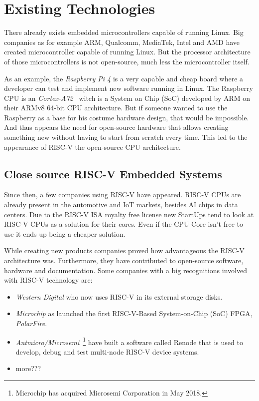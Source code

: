 \chapter{Existing Technologies}
There already exists embedded microcontrollers capable of running Linux. Big companies as for example ARM, Qualcomm, MediaTek, Intel and AMD have created microcontroller capable of running Linux. But the processor architecture of those microcontrollers is not open-source, much less the microcontroller itself. 

As an example, the \textit{Raspberry Pi 4} is a very capable and cheap board where a developer can test and implement new software running in Linux. The Raspberry CPU is an \textit{Cortex-A72}~\cite{cortex_a72} witch is a System on Chip (SoC) developed by ARM on their ARMv8 64-bit CPU architecture. But if someone wanted to use the Raspberry as a base for his costume hardware design, that would be impossible. And thus appears the need for open-source hardware that allows creating something new without having to start from scratch every time. This led to the appearance of RISC-V the open-source CPU architecture.


\section{Close source RISC-V Embedded Systems}
Since then, a few companies using RISC-V have appeared. RISC-V CPUs are already present in the automotive and IoT markets, besides AI chips in data centers. Due to the RISC-V ISA royalty free license new StartUps tend to look at RISC-V CPUs as a solution for their cores. Even if the CPU Core isn't free to use it ends up being a cheaper solution.

While creating new products companies proved how advantageous the RISC-V architecture was. Furthermore, they have contributed to open-source software, hardware and documentation. Some companies with a big recognitions involved with RISC-V technology are:

\begin{itemize}
    \item \textit{Western Digital} who now uses RISC-V in its external storage disks. 
    \item \textit{Microchip} as launched the first RISC-V-Based System-on-Chip (SoC) FPGA, \textit{PolarFire}. 
    \item \textit{Antmicro/Microsemi}~\footnote{Microchip has acquired Microsemi Corporation in May 2018.} have built a software called Renode that is used to develop, debug and test multi-node RISC-V device systems.
    \item more???
\end{itemize}

